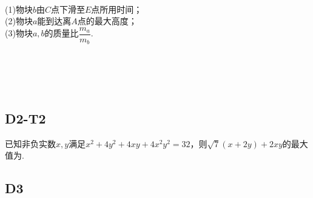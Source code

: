 \documentclass[UTF8,a4paper,11 pt]{ctexart}%
\begin{document}
	\\(1)物块$ b $由$ C $点下滑至$ E $点所用时间；\\
	(2)物块$ a $能到达离$ A $点的最大高度；\\
	(3)物块$ a,b $的质量比$ \dfrac{m_a}{m_b} $.
	\\\quad\\\quad\\\quad\\\quad\\\quad
	\subsection{D2-T2}\noindent
	已知非负实数$ x,y $满足$ x^2+4y^2+4xy+4x^2y^2=32 $，则$ \sqrt{7}(x+2y)+2xy $的最大值为\underline{\qquad\qquad}.
	\clearpage\subsection{D3}
\end{document}
